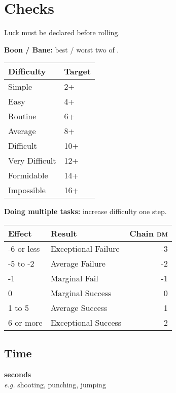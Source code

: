 \documentclass{cheatsheet}
\begin{document}
\section{Checks}

\begin{multicols}{3}
\begin{emphbox}
  \begin{center}

    Luck must be declared before rolling.

    \textbf{Boon / Bane:} best / worst two of .
  \end{center}
\end{emphbox}

\begin{tabularx}{\linewidth}{Xl} \toprule
Difficulty & Target \\ \midrule
Simple & 2+ \\
Easy & 4+ \\
Routine & 6+ \\
Average & 8+ \\
Difficult & 10+ \\
Very Difficult & 12+ \\
Formidable & 14+ \\
Impossible & 16+ \\ \bottomrule
\end{tabularx}

\textbf{Doing multiple tasks:} increase difficulty one step.

\columnbreak

\begin{tabularx}{\linewidth}{lXr} \toprule
Effect & Result & Chain \textsc{dm} \\ \midrule
-6 or less & Exceptional Failure & -3 \\
-5 to -2 & Average Failure & -2 \\
-1 & Marginal Fail & -1 \\
0 & Marginal Success & 0 \\
1 to 5 & Average Success & 1 \\
6 or more & Exceptional Success & 2 \\ \bottomrule
\end{tabularx}

\subsection{Time}

\textbf{ seconds}\\
\textit{e.g.} shooting, punching, jumping


\end{multicols}
\end{document}
